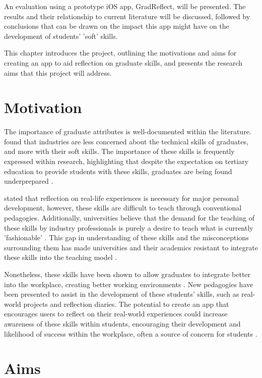 \documentclass{l4proj}
\begin{document}
An evaluation using a prototype iOS app, GradReflect, will be presented. The results and their relationship to current literature will be discussed, followed by conclusions that can be drawn on the impact this app might have on the development of students' 'soft' skills.

This chapter introduces the project, outlining the motivations and aims for creating an app to aid reflection on graduate skills, and presents the research aims that this project will address.


\section{Motivation}
The importance of graduate attributes is well-documented within the literature. \citet{litchfield_contextualising_2010} found that industries are less concerned about the technical skills of graduates, and more with their soft skills. The importance of these skills is frequently expressed within research, highlighting that despite the expectation on tertiary education to provide students with these skills, graduates are being found underprepared \citep{stevens_industry_2016}. 

\citet{abernethy_teaching_2009} stated that reflection on real-life experiences is necessary for major personal development, however, these skills are difficult to teach through conventional pedagogies. Additionally, universities believe that the demand for the teaching of these skills by industry professionals is purely a desire to teach what is currently 'fashionable' \citep{stevens_industry_2016}. This gap in understanding of these skills and the misconceptions surrounding them has made universities and their academics resistant to integrate these skills into the teaching model \citep{barr_2019}. 

Nonetheless, these skills have been shown to allow graduates to integrate better into the workplace, creating better working environments \citep{stevens_industry_2016}. New pedagogies have been presented to assist in the development of these students' skills, such as real-world projects and reflection diaries. The potential to create an app that encourages users to reflect on their real-world experiences could increase awareness of these skills within students, encouraging their development and likelihood of success within the workplace, often a source of concern for students \citep{stevens_industry_2016}.


\section{Aims} \label{IntroAims}
\end{document}
